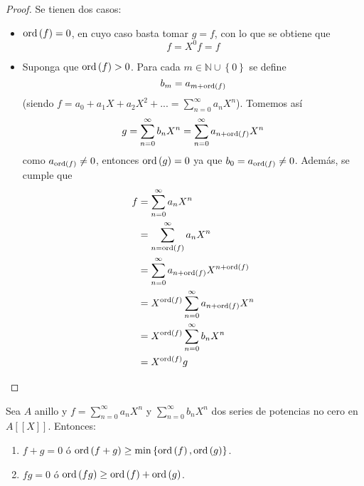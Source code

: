 \documentclass[12pt]{report}
\theoremstyle{largebreak}
\newcommand{\ord}[1]{\ensuremath{\textup{ord}\left(#1\right)}}
\begin{document}
    \begin{proof}
        Se tienen dos casos:
        \begin{itemize}
            \item $\ord{f}=0$, en cuyo caso basta tomar $g=f$, con lo que se obtiene que
            \begin{equation*}
                f=X^0f=f
            \end{equation*}
            \item Suponga que $\ord{f}>0$. Para cada $m\in\mathbb{N}\cup\left\{0\right\}$ se define
            \begin{equation*}
                b_m=a_{ m+\ord{f}}
            \end{equation*}
            (siendo $f=a_0+a_1X+a_2X^2+...=\sum_{ n=0}^\infty a_nX^n$). Tomemos así
            \begin{equation*}
                g=\sum_{ n=0}^\infty b_nX^n=\sum_{ n=0}^\infty a_{n+\ord{f}}X^n
            \end{equation*}
            como $a_{\ord{f}}\neq0$, entonces $\ord{g}=0$ ya que $b_0=a_{\ord{f}}\neq0$. Además, se cumple que
            \begin{equation*}
                \begin{split}
                    f&=\sum_{ n=0}^\infty a_nX^n\\
                    &=\sum_{ n=\ord{f}}^\infty a_nX^n\\
                    &=\sum_{ n=0}^\infty a_{n+\ord{f}}X^{n+\ord{f}}\\
                    &=X^{\ord{f}}\sum_{ n=0}^\infty a_{n+\ord{f}}X^{n}\\
                    &=X^{\ord{f}}\sum_{ n=0}^\infty b_{n}X^{n}\\
                    &=X^{\ord{f}}g\\
                \end{split}
            \end{equation*}
        \end{itemize}
    \end{proof}

    \begin{propo}
        Sea $A$ anillo y $f=\sum_{ n=0}^\infty a_nX^n$ y $\sum_{ n=0}^\infty b_nX^n$ dos series de potencias no cero en $A[[X]]$. Entonces:
        \begin{enumerate}
            \item $f+g=0$ ó $\ord{f+g}\geq\min\left\{\ord{f},\ord{g}\right\}$.
            \item $fg=0$ ó $\ord{fg}\geq\ord{f}+\ord{g}$.
        \end{enumerate}
    \end{propo}
\end{document}
